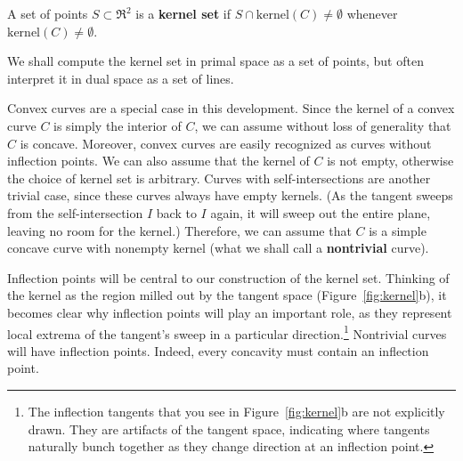 \documentclass[12pt]{article}
\begin{document}
\begin{defn2}
A set of points $S \subset \Re^2$ is a 
{\bf kernel set}
if $S \cap \mbox{kernel}(C) \neq \emptyset$ 
whenever  $\mbox{kernel}(C) \neq \emptyset$.
\end{defn2}

\noindent 
We shall compute the kernel set in primal space as a set of points,
but often interpret it in dual space as a set of lines.

Convex curves are a special case in this development.
Since the kernel of a convex curve $C$ is simply the interior of $C$,
we can assume without loss of generality that $C$ is concave.
Moreover, convex curves are easily recognized as curves without inflection
points.
We can also assume that the kernel of $C$ is
not empty, otherwise the choice of kernel set is arbitrary.
Curves with self-intersections are another trivial case,
since these curves always have empty kernels.
(As the tangent sweeps from the self-intersection $I$ back to $I$ again,
it will sweep out the entire plane, leaving no room for the kernel.)
Therefore, we can assume that $C$ is a simple concave 
curve with nonempty kernel (what we shall call a {\bf nontrivial} curve).


Inflection points will be central to our construction of the kernel set.
Thinking of the kernel as the region milled out by the tangent space (Figure~\ref{fig:kernel}b),
it becomes clear why inflection points will play an important role,
as they represent local extrema of the tangent's sweep in a particular
direction.\footnote{The inflection tangents 
	that you see in 
	Figure~\ref{fig:kernel}b are not explicitly drawn.
	They are artifacts of the tangent space, indicating where
	tangents naturally bunch together as they change direction
	at an inflection point.}
Nontrivial curves will have inflection points.
Indeed, every concavity must contain an inflection point.

%	
\end{document}
